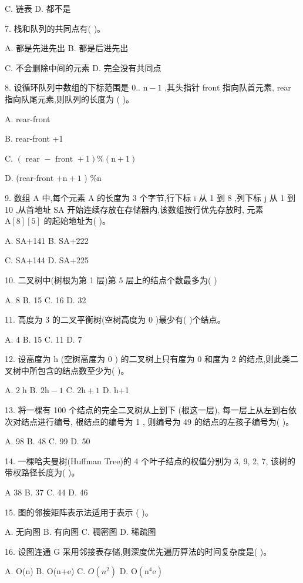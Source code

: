 C. 链表 D. 都不是

7. 栈和队列的共同点有(   )。

A. 都是先进先出 B. 都是后进先出

C. 不会删除中间的元素 D. 完全没有共同点

8. 设循环队列中数组的下标范围是 0.. \(\mathrm{n} - 1\) ,其头指针 front 指向队首元素, rear 指向队尾元素,则队列的长度为 (  )。

A. rear-front 

B. rear-front +1

C. \(\left( {\text{ rear } - \text{ front } + 1}\right) \% \left( {\mathrm{n} + 1}\right)\) 

D. (rear-front \(+ \mathrm{n} + 1\) ) \%n

9. 数组 \(\mathrm{A}\) 中,每个元素 \(\mathrm{A}\) 的长度为 3 个字节,行下标 \(\mathrm{i}\) 从 1 到 8 ,列下标 \(\mathrm{j}\) 从 1 到 10 ,从首地址 SA 开始连续存放在存储器内,该数组按行优先存放时, 元素 \(\mathrm{A}\left\lbrack  8\right\rbrack  \left\lbrack  5\right\rbrack\) 的起始地址为(   )。

A. SA+141 B. SA+222

C. SA+144 D. SA+225

10. 二叉树中(树根为第 1 层)第 5 层上的结点个数最多为(   )

A. 8 B. 15 C. 16 D. 32

11. 高度为 3 的二叉平衡树(空树高度为 0 )最少有(   )个结点。

A. 4 B. 15 C. 11 D. 7

12. 设高度为 \(\mathrm{h}\) (空树高度为 0 ) 的二叉树上只有度为 0 和度为 2 的结点,则此类二叉树中所包含的结点数至少为(   )。

A. \(2\mathrm{\;h}\) B. \(2\mathrm{h} - 1\) C. \(2\mathrm{h} + 1\) D. h+1

13. 将一棵有 100 个结点的完全二叉树从上到下 (根这一层), 每一层上从左到右依次对结点进行编号, 根结点的编号为 1 , 则编号为 49 的结点的左孩子编号为(   )。

A. 98 B. 48 C. 99 D. 50

14. 一棵哈夫曼树(Huffman Tree)的 4 个叶子结点的权值分别为 3, 9, 2, 7, 该树的带权路径长度为(   )。

A 38 B. 37 C. 44 D. 46

15. 图的邻接矩阵表示法适用于表示 (   )。

A. 无向图 B. 有向图 C. 稠密图 D. 稀疏图

16. 设图连通 G 采用邻接表存储,则深度优先遍历算法的时间复杂度是(   )。

A. O(n) B. O(n+e) C. \(O\left( {n}^{2}\right)\) D. \(\mathrm{O}\left( {{\mathrm{n}}^{4}\mathrm{e}}\right)\)

